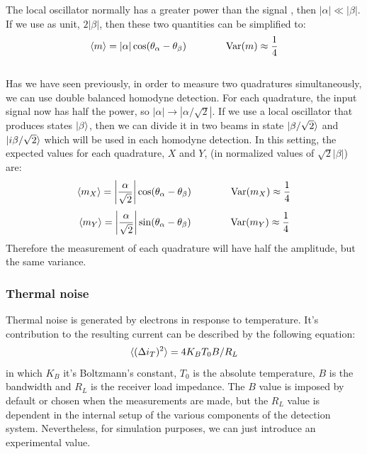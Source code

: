 %
The local oscillator normally has a greater power than the signal
, then $|\alpha| \ll |\beta|$. If we use as unit, $2|\beta|$, then these two quantities can be simplified to:
%
\begin{equation}
\label{eq:approx_noise}
\braket{m} = |\alpha|\cos({\theta_\alpha - \theta_\beta})
\qquad
\qquad
\textrm{Var}(m) \approx \frac{1}{4}
\end{equation}
%
\cite{hans2004}
\\
Has we have seen previously, in order to measure two quadratures simultaneously, we can use double balanced homodyne detection. For each quadrature, the input signal now has half the power, so $|\alpha| \rightarrow |\alpha/\sqrt{2}|$.  If we use a local oscillator that produces states $\ket{\beta}$, then we can divide it in two beams in state $\ket{\beta/\sqrt{2}}$ and $\ket{i\beta/\sqrt{2}}$ which will be used in each homodyne detection. In this setting, the expected values for each quadrature, $X$ and $Y$, (in normalized values of $\sqrt{2}|\beta|$) are:
%
\begin{equation}
\braket{m_X} = \left|\frac{\alpha}{\sqrt{2}}\right| \cos({\theta_\alpha - \theta_\beta})
\qquad
\qquad
\textrm{Var}(m_X) \approx \frac{1}{4}
\end{equation}
%
%
\begin{equation}
\braket{m_Y} =  \left|\frac{\alpha}{\sqrt{2}}\right| \sin({\theta_\alpha - \theta_\beta})
\qquad
\qquad
\textrm{Var}(m_Y) \approx \frac{1}{4}
\end{equation}
%
Therefore the measurement of each quadrature will have half the amplitude, but the same variance.
%
%
%
\subsubsection{Thermal noise}
Thermal noise is generated by electrons in response to temperature. It's contribution to the resulting current can be described by the following equation:
\cite{fox2006}
%
\begin{equation}
\braket{(\Delta i_T)^2} = 4 K_B T_0 B/R_L
\end{equation}
%
in which $K_B$ it's Boltzmann's constant, $T_0$ is the absolute temperature, $B$ is the bandwidth and $R_L$ is the receiver load impedance. The $B$ value is imposed by default or chosen when the measurements are made, but the $R_L$ value is dependent in the internal setup of the various components of the detection system. Nevertheless, for simulation purposes, we can just introduce an experimental value.\\
\vspace{1cm}
%
%
